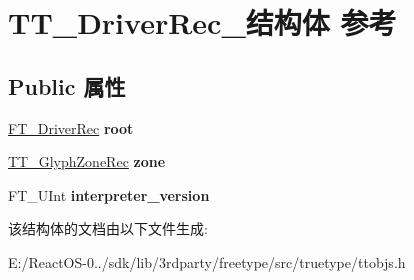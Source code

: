 \hypertarget{struct_t_t___driver_rec__}{}\section{T\+T\+\_\+\+Driver\+Rec\+\_\+结构体 参考}
\label{struct_t_t___driver_rec__}
\subsection*{Public 属性}
\begin{DoxyCompactItemize}
\item 
\mbox{\label{struct_t_t___driver_rec___a3a70567ac5409d7ecd3604cdeccf4631}} 
\hyperlink{struct_f_t___driver_rec__}{F\+T\+\_\+\+Driver\+Rec} {\bfseries root}
\item 
\mbox{\label{struct_t_t___driver_rec___a331bcdf6b1b3b46569d5f77f08330ce1}} 
\hyperlink{struct_t_t___glyph_zone_rec__}{T\+T\+\_\+\+Glyph\+Zone\+Rec} {\bfseries zone}
\item 
\mbox{\label{struct_t_t___driver_rec___a72907584e3c65347810e9422ffe02d63}} 
F\+T\+\_\+\+U\+Int {\bfseries interpreter\+\_\+version}
\end{DoxyCompactItemize}


该结构体的文档由以下文件生成\+:\begin{DoxyCompactItemize}
\item 
E\+:/\+React\+O\+S-\/0../sdk/lib/3rdparty/freetype/src/truetype/ttobjs.\+h\end{DoxyCompactItemize}
